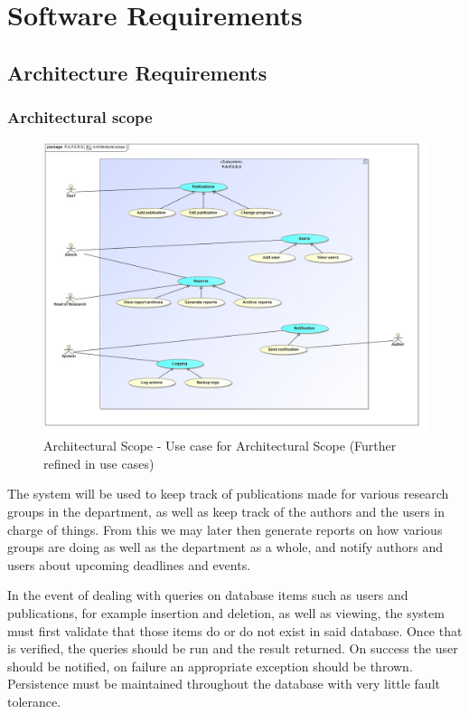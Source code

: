 \documentclass{article}
\begin{document}
	\cleardoublepage
	\section{Software Requirements}\label{sec:software}
	\subsection{Architecture Requirements}\label{subsec:architecture}
		\subsubsection{Architectural scope}\label{subsubsec:scope}
		
		\begin{figure}[H]
			\includegraphics[width=\linewidth]{../Diagrams/Architectural scope/Architectural scope.jpg}
			\caption{Architectural Scope - Use case for Architectural Scope (Further refined in use cases)}
		\end{figure}
		
		\par The system will be used to keep track of publications made for various research groups in the department, as well as keep track of the authors and the users in charge of things. From this we may later then generate reports on how various groups are doing as well as the department as a whole, and notify authors and users about upcoming deadlines and events.\\
		
		\par In the event of dealing with queries on database items such as users and publications, for example insertion and deletion, as well as viewing, the system must first validate that those items do or do not exist in said database. Once that is verified, the queries should be run and the result returned. On success the user should be notified, on failure an appropriate exception should be thrown. Persistence must be maintained throughout the database with very little fault tolerance.\\
		
\end{document}

